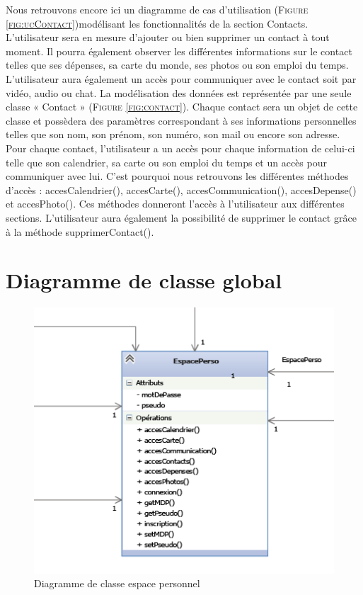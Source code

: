 \documentclass[11pt]{article}
\begin{document}
Nous retrouvons encore ici un diagramme de cas d’utilisation  (\textsc{Figure \ref{fig:ucContact}})modélisant les fonctionnalités de la section Contacts. L’utilisateur sera en mesure d’ajouter ou bien supprimer un contact à tout moment. Il pourra également observer les différentes informations sur le contact telles que ses dépenses, sa carte du monde, ses photos ou son emploi du temps. L’utilisateur aura également un accès pour communiquer avec le contact soit par vidéo, audio ou chat.
La modélisation des données est représentée par une seule classe « Contact »  (\textsc{Figure \ref{fig:contact}}). Chaque contact sera un objet de cette classe et possèdera des paramètres correspondant à ses informations personnelles telles que son nom, son prénom, son numéro, son mail ou encore son adresse. Pour chaque contact, l’utilisateur a un accès pour chaque information de celui-ci telle que son calendrier, sa carte ou son emploi du temps et un accès pour communiquer avec lui. C’est pourquoi nous retrouvons les différentes méthodes d’accès : accesCalendrier(), accesCarte(), accesCommunication(), accesDepense() et accesPhoto(). Ces méthodes donneront l’accès à l’utilisateur aux différentes sections. L’utilisateur aura également la possibilité de supprimer le contact grâce à la méthode supprimerContact().


\newpage
\section{Diagramme de classe global}
\begin{figure}[!h]
        \centering \includegraphics[scale=2]{espace.png}
        \caption{Diagramme de classe espace personnel}
         \label{fig:espace}
\end{figure}
\end{document}
